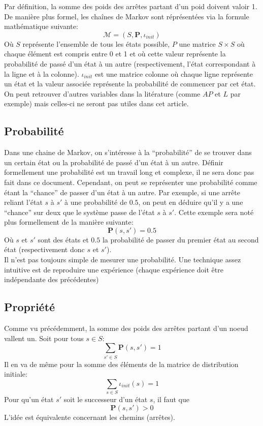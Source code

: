 \documentclass[letterpaper]{article}
\begin{document}
    Par définition, la somme des poids des arrêtes partant d'un poid doivent valoir 1.  
    De manière plus formel, les chaînes de Markov sont réprésentées via la formule 
    mathématique suivante:
    $$\mathcal{M} = (S, \mathbf{P}, \iota_{init})$$
    Où $S$ représente l'ensemble de tous les états possible, $P$ une matrice $S \times S$
    où chaque élément est compris entre 0 et 1 et où cette valeur représente la probabilité 
    de passé d'un état à un autre (respectivement, l'état correspondant à la ligne et à la colonne).
    $\iota_{init}$ est une matrice colonne où chaque ligne représente un état et la valeur
    associée représente la probabilité de commencer par cet état.  On peut retrouver d'autres
    variables dans la litérature (comme $AP$ et $L$ par exemple) mais celles-ci ne seront pas 
    utiles dans cet article.\\
    
  \subsection{Probabilité}
    Dans une chaine de Markov, on s'intéresse à la ``probabilité'' de se trouver dans un certain 
    état ou la probabilité de passé d'un état à un autre.  Définir formellement une probabilité
    est un travail long et complexe, il ne sera donc pas fait dans ce document.  Cependant, 
    on peut se représenter une probabilité comme étant la ``chance'' de passer d'un état à un autre.
    Par exemple, si une arrête reliant l'état $s$ à $s'$ à une probabilité de $0.5$, on peut en 
    déduire qu'il y a une ``chance'' sur deux que le système passe de l'état $s$ à $s'$.
    Cette exemple sera noté plus formellement de la manière suivante:
    $$\mathbf{P}(s, s') = 0.5$$
    Où $s$ et $s'$ sont des états et $0.5$ la probabilité de passer du premier état au second 
    état (respectivement donc $s$ et $s'$).\\
    Il n'est pas toujours simple de mesurer une probabilité.  Une technique assez intuitive est 
    de reproduire une expérience (chaque expérience doit être indépendante des précédentes) 
    
  \subsection{Propriété}
    Comme vu précédemment, la somme des poids des arrêtes partant d'un noeud vallent un.
    Soit pour tous $s \in S$:
    $$\sum\limits_{s' \in S} \mathbf{P}(s, s') = 1$$
    Il en va de même pour la somme des éléments de la matrice de distribution initiale:
    $$\sum\limits_{s \in S} \iota_{init}(s) = 1$$
    Pour qu'un état $s'$ soit le successeur d'un état $s$, il faut que 
    $$\mathbf{P}(s, s') > 0$$
    L'idée est équivalente concernant les chemins (arrêtes).
    
\end{document}
